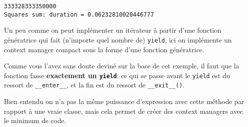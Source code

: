     \begin{Verbatim}[commandchars=\\\{\}]
333328333350000
Squares sum: duration = 0.06232810020446777

    \end{Verbatim}

    Un peu comme on peut implémenter un itérateur à partir d'une fonction
génératrice qui fait (n'importe quel nombre de) \texttt{yield}, ici on
implémente un context manager compact sous la forme d'une fonction
génératrice.

Comme vous l'avez sans doute deviné sur la base de cet exemple, il faut
que la fonction fasse \textbf{exactement un \texttt{yield}}: ce qui se
passe avant le \texttt{yield} est du ressort de \texttt{\_\_enter\_\_},
et la fin est du ressort de \texttt{\_\_exit\_\_()}.

Bien entendu on n'a pas la même puissance d'expression avec cette
méthode par rapport à une vraie classe, mais cela permet de créer des
context managers avec le minimum de code.


    
    
    
